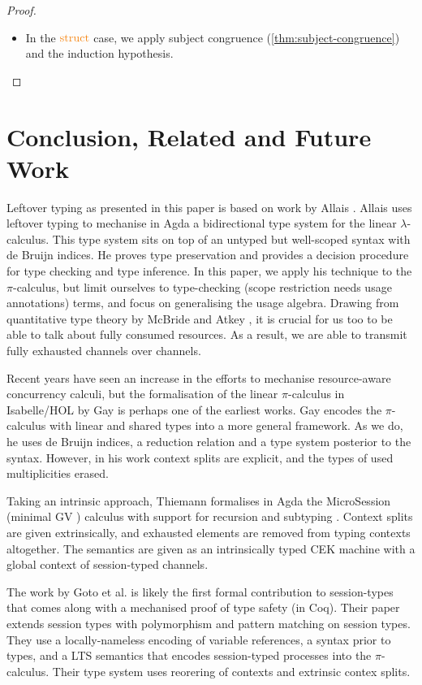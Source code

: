 \documentclass[a4paper,UKenglish,cleveref,autoref,thm-restate,authorcolumns]{lipics-v2019}
\theoremstyle{definition}
\newcommand{\lambdacalc}{$\lambda$-calculus}
\newcommand{\picalc}{$\pi$-calculus}
\newcommand{\constr}[1]{\textcolor{BurntOrange}{\operatorname{#1}}}
\begin{document}
\begin{proof}
\begin{itemize}
    \item
    In the $\constr{struct}$ case, we apply subject congruence (\autoref{thm:subject-congruence}) and the induction hypothesis.
  \end{itemize}
\end{proof}

\section{Conclusion, Related and Future Work}

Leftover typing as presented in this paper is based on work by Allais \cite{Allais2018a}.
Allais uses leftover typing to mechanise in Agda a bidirectional type system for the linear \lambdacalc{}.
This type system sits on top of an untyped but well-scoped syntax with de Bruijn indices.
He proves type preservation and provides a decision procedure for type checking and type inference.
In this paper, we apply his technique to the \picalc{}, but limit ourselves to type-checking (scope restriction needs usage annotations) terms, and focus on generalising the usage algebra.
Drawing from quantitative type theory by McBride and Atkey \cite{McBride2016, Atkey2018}, it is crucial for us too to be able to talk about fully consumed resources.
As a result, we are able to transmit fully exhausted channels over channels.

Recent years have seen an increase in the efforts to mechanise resource-aware concurrency calculi, but the formalisation of the linear \picalc{} in Isabelle/HOL by Gay \cite{Gay2001} is perhaps one of the earliest works.
Gay encodes the \picalc{} with linear and shared types into a more general framework.
As we do, he uses de Bruijn indices, a reduction relation and a type system posterior to the syntax.
However, in his work context splits are explicit, and the types of used multiplicities erased.

Taking an intrinsic approach, Thiemann formalises in Agda the MicroSession (minimal GV \cite{}) calculus with support for recursion and subtyping \cite{Thiemann2019}.
Context splits are given extrinsically, and exhausted elements are removed from typing contexts altogether.
The semantics are given as an intrinsically typed CEK machine with a global context of session-typed channels.

The work by Goto et al. \cite{Goto2016a} is likely the first formal contribution to session-types that comes along with a mechanised proof of type safety (in Coq). 
Their paper extends session types with polymorphism and pattern matching on session types.
They use a locally-nameless encoding of variable references, a syntax prior to types, and a LTS semantics that encodes session-typed processes into the \picalc{}.
Their type system uses reorering of contexts and extrinsic contex splits. 
\end{document}
